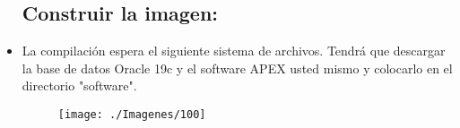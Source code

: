 \begin{itemize}
 \subsection{Construir la imagen:}
	\item La compilación espera el siguiente sistema de archivos. Tendrá que descargar la base de datos Oracle 19c y el software APEX usted mismo y colocarlo en el directorio "software".
                     \begin{figure}[H]
		\begin{center}
		\texttt{[image: ./Imagenes/100]}
		\end{center}
		\end{figure}
	

\end{itemize}







